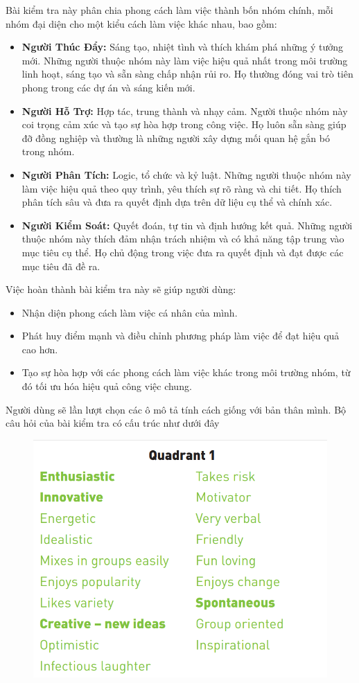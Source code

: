 Bài kiểm tra này phân chia phong cách làm việc thành bốn nhóm chính, mỗi nhóm đại diện cho một kiểu cách làm việc khác nhau, bao gồm:

\begin{itemize}
    \item \textbf{Người Thúc Đẩy:} Sáng tạo, nhiệt tình và thích khám phá những ý tưởng mới. Những người thuộc nhóm này làm việc hiệu quả nhất trong môi trường linh hoạt, sáng tạo và sẵn sàng chấp nhận rủi ro. Họ thường đóng vai trò tiên phong trong các dự án và sáng kiến mới.
    \item \textbf{Người Hỗ Trợ:} Hợp tác, trung thành và nhạy cảm. Người thuộc nhóm này coi trọng cảm xúc và tạo sự hòa hợp trong công việc. Họ luôn sẵn sàng giúp đỡ đồng nghiệp và thường là những người xây dựng mối quan hệ gắn bó trong nhóm.
    \item \textbf{Người Phân Tích:} Logic, tổ chức và kỷ luật. Những người thuộc nhóm này làm việc hiệu quả theo quy trình, yêu thích sự rõ ràng và chi tiết. Họ thích phân tích sâu và đưa ra quyết định dựa trên dữ liệu cụ thể và chính xác.
    \item \textbf{Người Kiểm Soát:} Quyết đoán, tự tin và định hướng kết quả. Những người thuộc nhóm này thích đảm nhận trách nhiệm và có khả năng tập trung vào mục tiêu cụ thể. Họ chủ động trong việc đưa ra quyết định và đạt được các mục tiêu đã đề ra.
\end{itemize}

Việc hoàn thành bài kiểm tra này sẽ giúp người dùng:

\begin{itemize}
    \item Nhận diện phong cách làm việc cá nhân của mình.
    \item Phát huy điểm mạnh và điều chỉnh phương pháp làm việc để đạt hiệu quả cao hơn.
    \item Tạo sự hòa hợp với các phong cách làm việc khác trong môi trường nhóm, từ đó tối ưu hóa hiệu quả công việc chung.
\end{itemize}

Người dùng sẽ lần lượt chọn các ô mô tả tính cách giống với bản thân mình. Bộ câu hỏi của bài kiểm tra có cấu trúc như dưới đây

\begin{figure}[H]
    \centering
    \includegraphics[width=0.8\linewidth]{images/ws1.png}
\end{figure}

